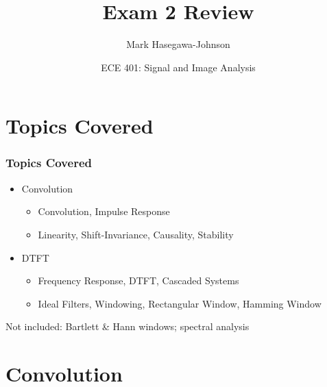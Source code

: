 \documentclass{beamer}
\title{Exam 2 Review}
\author{Mark Hasegawa-Johnson}
\date{ECE 401: Signal and Image Analysis}
\begin{document}
\begin{frame}
  \maketitle
\end{frame}

\begin{frame}
  \tableofcontents
\end{frame}

\section[Topics]{Topics Covered}
\setcounter{subsection}{1}

\begin{frame}
  \frametitle{Topics Covered}

  \begin{itemize}
  \item Convolution
    \begin{itemize}
    \item Convolution, Impulse Response
    \item Linearity, Shift-Invariance, Causality, Stability
    \end{itemize}
  \item DTFT
    \begin{itemize}
    \item Frequency Response, DTFT, Cascaded Systems
    \item Ideal Filters, Windowing, Rectangular Window, Hamming Window
    \end{itemize}
  \end{itemize}
  Not included: Bartlett \& Hann windows; spectral analysis
\end{frame}

\section[Convolution]{Convolution}
\setcounter{subsection}{1}
\end{document}
